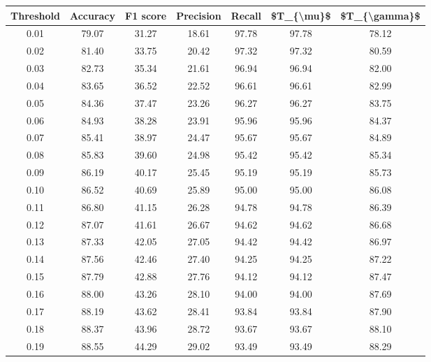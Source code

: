\begin{tabular}{|c|c|c|c|c|c|c|}
\hline
 Threshold &  Accuracy &  F1 score &  Precision &  Recall &  \$T\_\{\textbackslash mu\}\$ &  \$T\_\{\textbackslash gamma\}\$ \\
\hline
      0.01 &     79.07 &     31.27 &      18.61 &   97.78 &      97.78 &         78.12 \\
      0.02 &     81.40 &     33.75 &      20.42 &   97.32 &      97.32 &         80.59 \\
      0.03 &     82.73 &     35.34 &      21.61 &   96.94 &      96.94 &         82.00 \\
      0.04 &     83.65 &     36.52 &      22.52 &   96.61 &      96.61 &         82.99 \\
      0.05 &     84.36 &     37.47 &      23.26 &   96.27 &      96.27 &         83.75 \\
      0.06 &     84.93 &     38.28 &      23.91 &   95.96 &      95.96 &         84.37 \\
      0.07 &     85.41 &     38.97 &      24.47 &   95.67 &      95.67 &         84.89 \\
      0.08 &     85.83 &     39.60 &      24.98 &   95.42 &      95.42 &         85.34 \\
      0.09 &     86.19 &     40.17 &      25.45 &   95.19 &      95.19 &         85.73 \\
      0.10 &     86.52 &     40.69 &      25.89 &   95.00 &      95.00 &         86.08 \\
      0.11 &     86.80 &     41.15 &      26.28 &   94.78 &      94.78 &         86.39 \\
      0.12 &     87.07 &     41.61 &      26.67 &   94.62 &      94.62 &         86.68 \\
      0.13 &     87.33 &     42.05 &      27.05 &   94.42 &      94.42 &         86.97 \\
      0.14 &     87.56 &     42.46 &      27.40 &   94.25 &      94.25 &         87.22 \\
      0.15 &     87.79 &     42.88 &      27.76 &   94.12 &      94.12 &         87.47 \\
      0.16 &     88.00 &     43.26 &      28.10 &   94.00 &      94.00 &         87.69 \\
      0.17 &     88.19 &     43.62 &      28.41 &   93.84 &      93.84 &         87.90 \\
      0.18 &     88.37 &     43.96 &      28.72 &   93.67 &      93.67 &         88.10 \\
      0.19 &     88.55 &     44.29 &      29.02 &   93.49 &      93.49 &         88.29 \\

\end{tabular}
